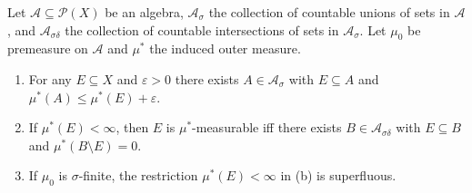 \newpage

\begin{exercise}
    Let \( \mathcal{A} \subseteq \mathcal{P}(X) \) be an algebra, \( \mathcal{A}_{\sigma} \) the collection of countable unions of sets in \( \mathcal{A} \), and \( \mathcal{A}_{\sigma\delta} \) the collection of countable intersections of sets in \( \mathcal{A}_{\sigma} \). Let \( \mu_{0} \) be premeasure on \( \mathcal{A} \) and \( \mu^{\ast} \) the induced outer measure.
    \begin{enumerate}[itemsep=0pt,label={\textbf{\alph*.}}]
        \item For any \( E \subseteq X \) and \( \varepsilon > 0 \) there exists \( A \in \mathcal{A}_{\sigma} \) with \( E \subseteq A \) and \( \mu^{\ast}(A) \le \mu^{\ast}(E) + \varepsilon \).
        \item If \( \mu^{\ast}(E) < \infty \), then \( E \) is \( \mu^{\ast} \)-measurable iff there exists \( B \in \mathcal{A}_{\sigma\delta} \) with \( E \subseteq B \) and \( \mu^{\ast}(B \setminus E) = 0 \).
        \item If \( \mu_{0} \) is \( \sigma \)-finite, the restriction \( \mu^{\ast}(E) < \infty \) in (b) is superfluous.
    \end{enumerate}
\end{exercise}

